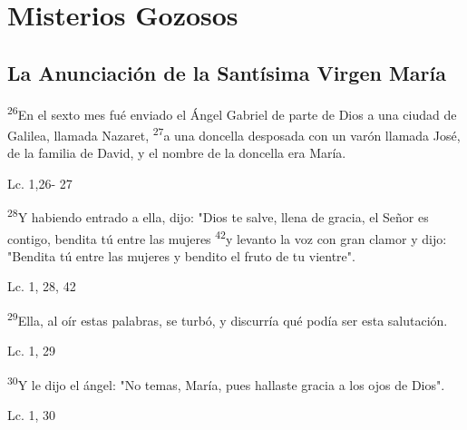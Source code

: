 \documentclass[a4paper,11pt]{article}
\begin{document}
  \section*{\hfil Misterios Gozosos \hfil}
    \subsection*{\hfil La Anunciación de la Santísima Virgen María \hfil}
      
          

      \textsuperscript{26}En el sexto mes fué enviado el Ángel Gabriel de parte de Dios a una ciudad de Galilea, llamada Nazaret, \textsuperscript{27}a una 
      doncella desposada con un varón llamada José, de la familia de David, y el nombre de la doncella era María.
      \begin{flushright}
        Lc. 1,26- 27
      \end{flushright}
      \medskip

      \textsuperscript{28}Y habiendo entrado a ella, dijo: "Dios te salve, llena de gracia, el Señor es contigo, bendita tú entre las mujeres 
      \textsuperscript{42}y levanto la voz con gran clamor y dijo: "Bendita tú entre las mujeres y bendito el fruto de tu vientre".
      \begin{flushright}
        Lc. 1, 28, 42
      \end{flushright}
      \medskip

      \textsuperscript{29}Ella, al oír estas palabras, se turbó, y discurría qué podía ser esta salutación.
      \begin{flushright}
        Lc. 1, 29
      \end{flushright}
      \medskip

      \textsuperscript{30}Y le dijo el ángel: "No temas, María, pues hallaste gracia a los ojos de Dios".
      \begin{flushright}
        Lc. 1, 30
      \end{flushright}
      \medskip
\end{document}
